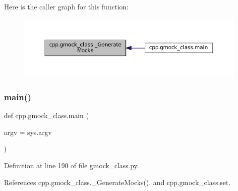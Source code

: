 Here is the caller graph for this function\+:
\nopagebreak
\begin{figure}[H]
\begin{center}
\leavevmode
\includegraphics[width=350pt]{namespacecpp_1_1gmock__class_a3f8d5ceabb0bd6143422efeccc900ca9_icgraph}
\end{center}
\end{figure}
\mbox{\label{namespacecpp_1_1gmock__class_a8f99cfdd2b4f0a547d6585b1de78bac0}} 
\subsubsection{\texorpdfstring{main()}{main()}}
{\footnotesize\ttfamily def cpp.\+gmock\+\_\+class.\+main (\begin{DoxyParamCaption}\item[{}]{argv = {\ttfamily sys.argv} }\end{DoxyParamCaption})}



Definition at line 190 of file gmock\+\_\+class.\+py.



References cpp.\+gmock\+\_\+class.\+\_\+\+Generate\+Mocks(), and cpp.\+gmock\+\_\+class.\+set.


